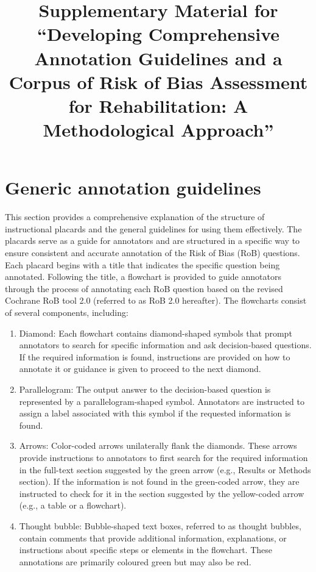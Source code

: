 \documentclass[sn-mathphys,Numbered]{sn-jnl}%
\begin{document}
\title[Article Title]{Supplementary Material for ``Developing Comprehensive Annotation Guidelines and a Corpus of Risk of Bias Assessment for Rehabilitation: A Methodological Approach''}



\maketitle


\section*{Generic annotation guidelines}
\label{sec:generic}
%
This section provides a comprehensive explanation of the structure of instructional placards and the general guidelines for using them effectively.
The placards serve as a guide for annotators and are structured in a specific way to ensure consistent and accurate annotation of the Risk of Bias (RoB) questions.
Each placard begins with a title that indicates the specific question being annotated.
Following the title, a flowchart is provided to guide annotators through the process of annotating each RoB question based on the revised Cochrane RoB tool 2.0 (referred to as RoB 2.0 hereafter).
The flowcharts consist of several components, including:
%
%
%
\begin{enumerate}
    \item Diamond: Each flowchart contains diamond-shaped symbols that prompt annotators to search for specific information and ask decision-based questions. If the required information is found, instructions are provided on how to annotate it or guidance is given to proceed to the next diamond.
    \item Parallelogram: The output answer to the decision-based question is represented by a parallelogram-shaped symbol. Annotators are instructed to assign a label associated with this symbol if the requested information is found.
    \item Arrows: Color-coded arrows unilaterally flank the diamonds. These arrows provide instructions to annotators to first search for the required information in the full-text section suggested by the green arrow (e.g., Results or Methods section). If the information is not found in the green-coded arrow, they are instructed to check for it in the section suggested by the yellow-coded arrow (e.g., a table or a flowchart).
    \item Thought bubble: Bubble-shaped text boxes, referred to as thought bubbles, contain comments that provide additional information, explanations, or instructions about specific steps or elements in the flowchart. These annotations are primarily coloured green but may also be red.
\end{enumerate}
\end{document}
